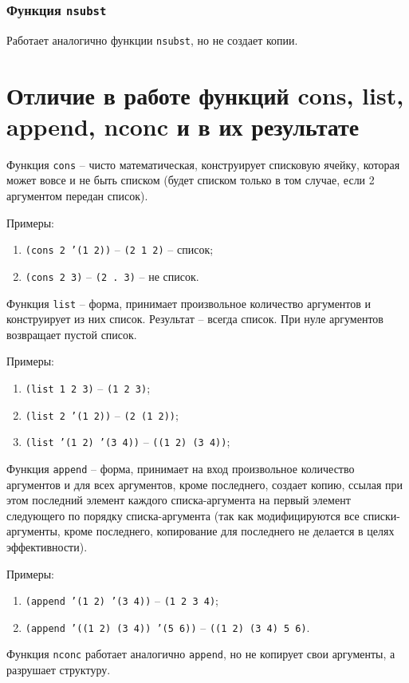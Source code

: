 \subsubsection{Функция \texttt{nsubst}}

Работает аналогично функции \texttt{nsubst}, но не создает копии.

\section{Отличие в работе функций cons, list, append, nconc и в их результате}

Функция \texttt{cons} -- чисто математическая, конструирует списковую ячейку, которая может вовсе и не быть списком (будет списком только в том случае, если 2 аргументом передан список).

Примеры:
\begin{enumerate}
    \item \texttt{(cons 2 '(1 2))} -- \texttt{(2 1 2)} -- список;
    \item \texttt{(cons 2 3)} -- \texttt{(2 . 3)} -- не список.
\end{enumerate}

Функция \texttt{list} -- форма, принимает произвольное количество аргументов и конструирует из них список. Результат -- всегда список. При нуле аргументов возвращает пустой список.

Примеры:
\begin{enumerate}
    \item \texttt{(list 1 2 3)} -- \texttt{(1 2 3)};
    \item \texttt{(list 2 '(1 2))} -- \texttt{(2 (1 2))};
    \item \texttt{(list '(1 2) '(3 4))} -- \texttt{((1 2) (3 4))};
\end{enumerate}

Функция \texttt{append} -- форма, принимает на вход произвольное количество аргументов и для всех аргументов, кроме последнего, создает копию, ссылая при этом последний элемент каждого списка-аргумента на первый элемент следующего по порядку списка-аргумента (так как модифицируются все списки-аргументы, кроме последнего, копирование для последнего не делается в целях эффективности).

Примеры:
\begin{enumerate}
    \item \texttt{(append '(1 2) '(3 4))} -- \texttt{(1 2 3 4)};
    \item \texttt{(append '((1 2) (3 4)) '(5 6))} -- \texttt{((1 2) (3 4) 5 6)}.
\end{enumerate}

Функция \texttt{nconc} работает аналогично \texttt{append}, но не копирует свои аргументы, а разрушает структуру.